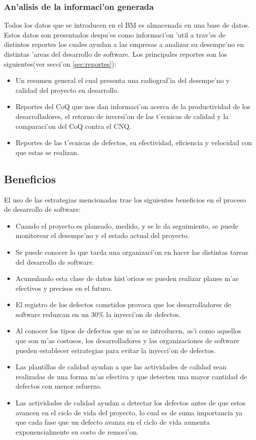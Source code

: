 \subsubsection{An'alisis de la informaci'on generada}
\label{sec:Analisisdelainformaciongenerada}
\noindent
Todos los datos que se introducen en el BM es almacenada en una base de datos. Estos datos son presentados despu'es como informaci'on 'util a trav'es de distintos reportes los cuales ayudan a las empresas a analizar su desempe'no en distintas 'areas del desarrollo de software. Los principales reportes son los siguientes(ver secci'on \ref{sec:reportes}):

\begin{itemize}
	\item Un resumen general el cual presenta una radiograf'ia del desempe'no y calidad del proyecto en desarrollo.
	\item Reportes del CoQ que nos dan informaci'on acerca de la productividad de los desarrolladores, el retorno de inversi'on de las t'ecnicas de calidad y la comparaci'on del CoQ contra el CNQ.
	\item Reportes de las t'ecnicas de defectos, su efectividad, eficiencia y velocidad con que estas se realizan.
\end{itemize}

\subsection{Beneficios}
\label{sec:Beneficios}
\noindent
El uso de las estrategias mencionadas trae los siguientes beneficios en el proceso de desarrollo de software:

\begin{itemize}
	\item Cuando el proyecto es planeado, medido, y se le da seguimiento, se puede monitorear el desempe'no y el estado actual del proyecto\cite{Humphrey2002}.
	\item Se puede conocer lo que tarda una organizaci'on en hacer las distintas tareas del desarrollo de software. 
	\item Acumulando esta clase de datos hist'oricos se pueden realizar planes m'as efectivos y precisos en el futuro.
	\item El registro de los defectos cometidos provoca que los desarrolladores de software reduzcan en un 30\% la inyecci'on de defectos\cite{Humphrey}.
	\item Al conocer los tipos de defectos que m'as se introducen, as'i como aquellos que son m'as costosos, los desarrolladores y las organizaciones de software pueden establecer estrategias para evitar la inyecci'on de defectos.
	\item Las plantillas de calidad ayudan a que las actividades de calidad sean realizadas de una forma m'as efectiva y que detecten una mayor cantidad de defectos con menor esfuerzo.
	\item Las actividades de calidad ayudan a detectar los defectos antes de que estos avancen en el ciclo de vida del proyecto, lo cual es de suma importancia ya que cada fase que un defecto avanza en el ciclo de vida aumenta exponencialmente su costo de remoci'on.
\end{itemize}

